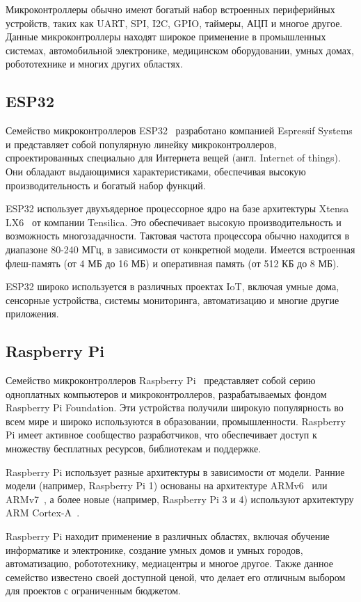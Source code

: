 Микроконтроллеры обычно имеют богатый набор встроенных периферийных устройств, таких как UART, SPI, I2C, GPIO, таймеры, АЦП и многое другое.
Данные микроконтроллеры находят широкое применение в промышленных системах, автомобильной электронике, медицинском оборудовании, умных домах, робототехнике и многих других областях.

\subsection{ESP32}

Семейство микроконтроллеров ESP32~\cite{esp32} разработано компанией Espressif Systems и представляет собой популярную линейку микроконтроллеров, спроектированных специально для Интернета вещей (англ. Internet of things). 
Они обладают выдающимися характеристиками, обеспечивая высокую производительность и богатый набор функций.

ESP32 использует двухъядерное процессорное ядро на базе архитектуры Xtensa LX6~\cite{xtensa} от компании Tensilica. 
Это обеспечивает высокую производительность и возможность многозадачности. 
Тактовая частота процессора обычно находится в диапазоне 80-240 МГц, в зависимости от конкретной модели. Имеется встроенная флеш-память (от 4 МБ до 16 МБ) и оперативная память (от 512 КБ до 8 МБ).

ESP32 широко используется в различных проектах IoT, включая умные дома, сенсорные устройства, системы мониторинга, автоматизацию и многие другие приложения.

\subsection{Raspberry Pi}

Семейство микроконтроллеров Raspberry Pi~\cite{raspberry-pi} представляет собой серию одноплатных компьютеров и микроконтроллеров, разрабатываемых фондом Raspberry Pi Foundation. 
Эти устройства получили широкую популярность во всем мире и широко используются в образовании, промышленности. 
Raspberry Pi имеет активное сообщество разработчиков, что обеспечивает доступ к множеству бесплатных ресурсов, библиотекам и поддержке.

Raspberry Pi использует разные архитектуры в зависимости от модели. Ранние модели (например, Raspberry Pi 1) основаны на архитектуре ARMv6~\cite{armv6} или ARMv7~\cite{armv7}, а более новые (например, Raspberry Pi 3 и 4) используют архитектуру ARM Cortex-A~\cite{cortex-a}.

Raspberry Pi находит применение в различных областях, включая обучение информатике и электронике, создание умных домов и умных городов, автоматизацию, робототехнику, медиацентры и многое другое. 
Также данное семейство известено своей доступной ценой, что делает его отличным выбором для проектов с ограниченным бюджетом. 

